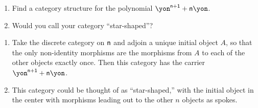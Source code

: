 \documentclass[Book-Poly]{subfiles}
\begin{document}
\begin{exercise}\label{ex.star_shaped}
\begin{enumerate}
	\item Find a category structure for the polynomial $\yon^{\ord{n}+\1}+\ord{n}\yon$.
	\item Would you call your category ``star-shaped''?
\qedhere
\end{enumerate}
\begin{solution}
\begin{enumerate}
    \item Take the discrete category on $\mathsf{n}$ and adjoin a unique initial object $A$, so that the only non-identity morphisms are the morphisms from $A$ to each of the other objects exactly once.
    Then this category has the carrier $\yon^{\ord{n}+\1} + \ord{n}\yon$.
    \item This category could be thought of as ``star-shaped,'' with the initial object in the center with morphisms leading out to the other $n$ objects as spokes.
\end{enumerate}
\end{solution}
\end{exercise}
\end{document}
